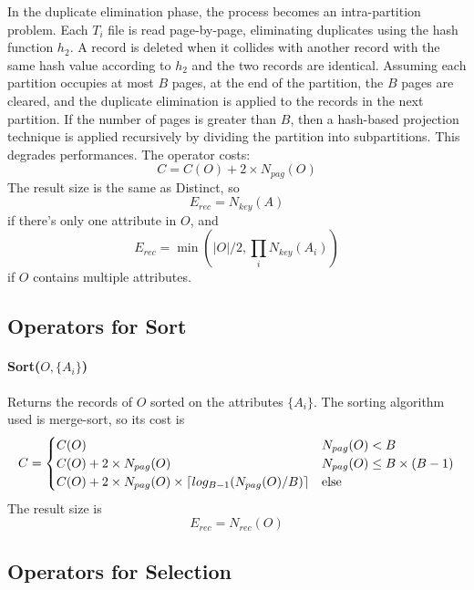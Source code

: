 In the duplicate elimination phase, the process becomes an intra-partition problem. Each $T_i$ file is read page-by-page, eliminating duplicates using the hash function $h_2$. A record is deleted when it collides with another record with the same hash value according to $h_2$ and the two records are identical. Assuming each partition occupies at most $B$ pages, at the end of the partition, the $B$ pages are cleared, and the duplicate elimination is applied to the records in the next partition. If the number of pages is greater than $B$, then a hash-based projection technique is applied recursively by dividing the partition into subpartitions. This degrades performances. The operator costs:
\begin{equation*}
    C = C(O) + 2 \times N_{pag}(O)
\end{equation*}
The result size is the same as Distinct, so
\begin{equation*}
    E_{rec} = N_{key}(A)
\end{equation*}
if there's only one attribute in $O$, and
\begin{equation*}
    E_{rec} = \min(|O|/2, \prod_i N_{key}(A_i))
\end{equation*}
if $O$ contains multiple attributes.

\subsection{Operators for Sort}

\paragraph{Sort($O, \{A_i\}$)}
Returns the records of $O$ sorted on the attributes $\{A_i\}$. The sorting algorithm used is merge-sort, so its cost is
\begin{equation*}
    C = \begin{cases}
        C(O) & N_{pag}(O) < B \\
        C(O) + 2 \times N_{pag}(O) & N_{pag}(O) \leq B \times (B-1) \\
        C(O) + 2 \times N_{pag}(O) \times \left\lceil log_{B-1}(N_{pag}(O) / B)\right\rceil & \text{else}
    \end{cases}
\end{equation*}
The result size is
\begin{equation*}
    E_{rec} = N_{rec}(O)
\end{equation*}

\subsection{Operators for Selection}

